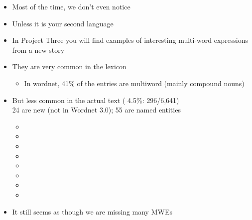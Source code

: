 \documentclass[a4paper,landscape,headrule,footrule,xetex]{foils}
\begin{document}
\begin{itemize}
\item Most of the time, we don't even notice
\item Unless it is your second language
\item In Project Three you will find examples of interesting
  multi-word expressions
\\ from a new story
\end{itemize}


\begin{itemize}
\item They are very common in the lexicon
  \begin{itemize}
  \item In wordnet,  41\% of the entries are multiword (mainly compound nouns)
  \end{itemize}
\item But less common in the actual text ( 4.5\%: 296/6,641)
\\ 24 are new (not in Wordnet 3.0); 55 are named entities




  \begin{itemize}
  \item {}
  \item {}
  \item {}
  \item {}
  \item {}
  \item {}
  \item {}
  \item {} 
  \end{itemize}
\item It still seems as though we are missing many MWEs
\end{itemize}
\end{document}
